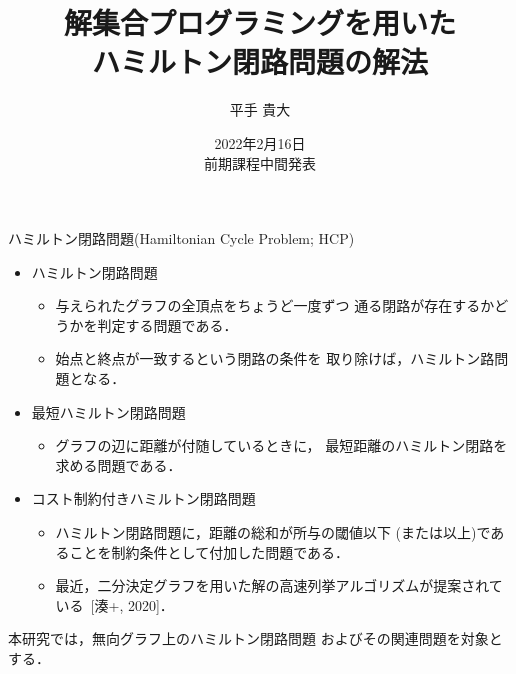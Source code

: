 \documentclass[dvipdfmx]{beamer}
\title{解集合プログラミングを用いた\\ハミルトン閉路問題の解法}
\author{平手 貴大}
\date{2022年2月16日\\前期課程中間発表}
\begin{document}
\frame{\maketitle}
\begin{frame}{ハミルトン閉路問題(Hamiltonian Cycle Problem; HCP)}
  \begin{itemize}
  \item \alert{ハミルトン閉路問題}
    \begin{itemize}
    \item 与えられたグラフの全頂点をちょうど一度ずつ
      通る閉路が存在するかどうかを判定する問題である．
    \item 始点と終点が一致するという閉路の条件を
      取り除けば，ハミルトン路問題となる．
    \end{itemize}
  \item \alert{最短ハミルトン閉路問題}
    \begin{itemize}
    \item グラフの辺に距離が付随しているときに，
      最短距離のハミルトン閉路を求める問題である．
    \end{itemize}
  \item \alert{コスト制約付きハミルトン閉路問題}
    \begin{itemize}
    \item ハミルトン閉路問題に，距離の総和が所与の閾値以下
      (または以上)であることを制約条件として付加した問題である．
    \item 最近，二分決定グラフを用いた解の高速列挙アルゴリズムが提案されている~[湊+, 2020]．
    \end{itemize}
  \end{itemize}
  \begin{alertblock}{}
    本研究では，無向グラフ上のハミルトン閉路問題
    およびその関連問題を対象とする．    
  \end{alertblock}
\end{frame}
\end{document}
